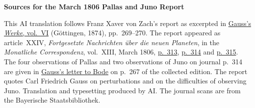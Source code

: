 \clearpage\thispagestyle{empty}
\begin{center}\textbf{Sources for the March 1806 Pallas and Juno Report}\end{center}
\noindent This AI translation follows Franz Xaver von Zach’s report as excerpted in \href{https://gdz.sub.uni-goettingen.de/id/PPN236007467}{Gauss’s \textit{Werke}, vol.~VI} (Göttingen, 1874), pp.~269--270. The report appeared as article~XXIV, \textit{Fortgesetzte Nachrichten über die neuen Planeten}, in the \textit{Monatliche Correspondenz}, vol.~XIII, March 1806, \href{https://www.digitale-sammlungen.de/en/view/bsb10538605?page=323}{p.~313}, \href{https://www.digitale-sammlungen.de/en/view/bsb10538605?page=324}{p.~314} and \href{https://www.digitale-sammlungen.de/en/view/bsb10538605?page=325}{p.~315}. The four observations of Pallas and two observations of Juno on journal p.~314 are given in \hyperlink{native-272}{Gauss’s letter to Bode} on p.~267 of the collected edition. The report quotes Carl Friedrich Gauss on perturbations and on the difficulties of observing Juno. Translation and typesetting produced by AI. The journal scans are from the Bayerische Staatsbibliothek.
\clearpage
